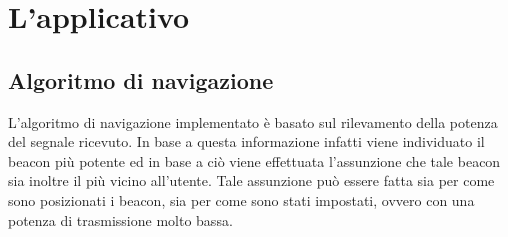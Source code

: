\documentclass[../SperimentazioniPratiche.tex]{subfiles}
\begin{document}
\section{L'applicativo}
	\subsection{Algoritmo di navigazione}
		L'algoritmo di navigazione implementato è basato sul rilevamento della potenza del segnale ricevuto. In base a questa informazione infatti viene individuato il beacon più potente ed in base a ciò viene effettuata l'assunzione che tale beacon sia inoltre il più vicino all'utente. Tale assunzione può essere fatta sia per come sono posizionati i beacon, sia per come sono stati impostati, ovvero con una potenza di trasmissione molto bassa.
		
\end{document}
